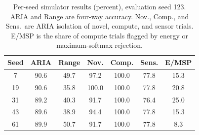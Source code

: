 \begin{table}[t]
\caption{Per-seed simulator results (percent), evaluation seed 123. ARIA and Range are four-way accuracy. Nov., Comp., and Sens.\ are ARIA isolation of novel, compute, and sensor trials. E/MSP is the share of compute trials flagged by energy or maximum-softmax rejection.}
\label{tab:seeds}
\centering
\small
\begin{tabular}{ccccccc}
\toprule
Seed & ARIA & Range & Nov. & Comp. & Sens. & E/MSP \\
\midrule
7 & 90.6 & 49.7 & 97.2 & 100.0 & 77.8 & 15.3 \\
19 & 90.6 & 35.8 & 100.0 & 100.0 & 77.8 & 20.8 \\
31 & 89.2 & 40.3 & 91.7 & 100.0 & 76.4 & 25.0 \\
43 & 89.6 & 38.9 & 94.4 & 100.0 & 77.8 & 15.3 \\
61 & 89.9 & 50.7 & 91.7 & 100.0 & 77.8 & 8.3 \\
\bottomrule
\end{tabular}
\end{table}
